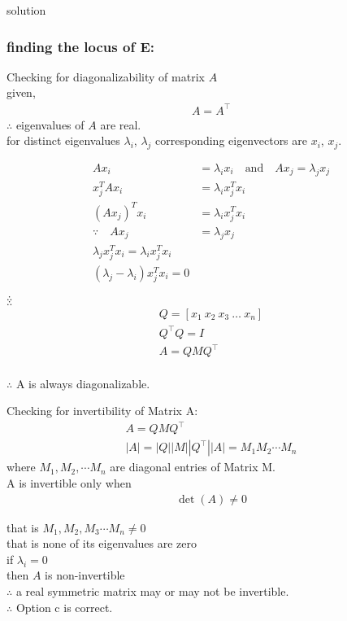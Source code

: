 \documentclass{beamer}
\begin{document}
\begin{frame}{solution}
    \frametitle{finding the locus of E:}
Checking for diagonalizability of matrix $A$ \\
given,
\begin{align}
A = A^\top
\end{align}
$\therefore$ eigenvalues of $A$ are real.\\
for distinct eigenvalues $\lambda_i$, $\lambda_j$ corresponding eigenvectors are $x_i$, $x_j$.
\end{frame}
\begin{frame}
\begin{align}
Ax_i &= \lambda_i x_i \quad \text{and} \quad Ax_j = \lambda_j x_j \\x_j^T A x_i &= \lambda_i x_j^T x_i \\(Ax_j)^T x_i &= \lambda_i x_j^T x_i \\\because \quad Ax_j &= \lambda_j x_j\\
\lambda_j x_j^T x_i = \lambda_i x_j^T x_i\\
(\lambda_j - \lambda_i) x_j^T x_i = 0
\end{align}
\end{frame}
\begin{frame}
$\therefore$ \\
$\therefore$ \\
\begin{align}
Q = [x_1 \ x_2 \ x_3 \ \dots \ x_n] \\
Q^\top Q = I\\
A = Q MQ^\top
\end{align}
\\
$\therefore$ A is always diagonalizable.
\end{frame}
\begin{frame}
Checking for invertibility of Matrix  A:
\begin{align}
A = Q M Q^\top \\|A| = |Q| |M| |Q^\top|
|A| = M_1 M_2 \cdots M_n
\end{align}
where $M_1, M_2, \cdots M_n$ are diagonal entries of Matrix M.\\
A is invertible only when 
\begin{align}
\det(A) \neq 0 
\end{align}
\end{frame}
\begin{frame}
that is $M_1, M_2, M_3 \cdots M_n \neq 0$ \\
that is none of its eigenvalues are zero \\

if $\lambda_i = 0$ \\
then $A$ is non-invertible \\

$\therefore$ a real symmetric matrix may or may not be invertible.\\
$\therefore$ Option c is correct.
\end{frame}
\end{document}
